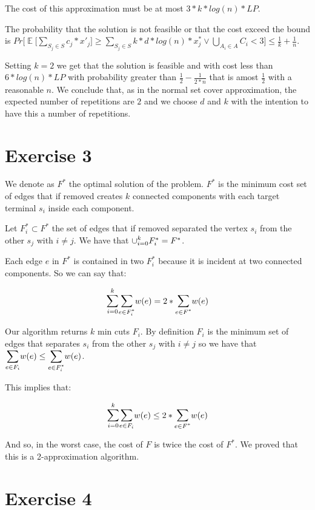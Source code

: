 \documentclass[paper=a4, fontsize=11pt]{scrartcl} %
\numberwithin{equation}{section} %
\numberwithin{figure}{section} %
\numberwithin{table}{section} %
\DeclareMathOperator*{\E}{\mathbb{E}}
\begin{document}
The cost of this approximation must be at most $3*k*log(n)*LP$.

The probability that the solution is not feasible or that the cost exceed the bound is $Pr\Big[\E\big[\sum_{S_j \in S} c_j*x'_j\big] \geq \sum_{S_j \in S} k*d*log(n)*x^*_j \lor \bigcup_{A_i \in A} C_i < 3\Big] \leq \frac{1}{k} + \frac{1}{n}$.

Setting $k = 2$ we get that the solution is feasible and with cost less than $6*log(n)*LP$ with probability greater than $\frac{1}{2} - \frac{1}{2*n}$ that is amost $\frac{1}{2}$ with a reasonable $n$.
We conclude that, as in the normal set cover approximation, the expected number of repetitions are $2$ and we choose $d$ and $k$ with the intention to have this a number of repetitions.

\section{Exercise 3}

We denote as $F^*$ the optimal solution of the problem. $F^*$ is the minimum cost set of edges that if removed creates $k$ connected components with each target terminal $s_i$ inside each component.

Let $F_i^* \subset F^*$ the set of edges that if removed separated the vertex $s_i$ from the other $s_j$ with $i \ne j$. We have that $\mathlarger{\cup}_{i = 0}^k F_i^* = F^*$.

Each edge $e$ in $F^*$ is contained in two $F_i^*$ because it is incident at two connected components. So we can say that:

\[
\mathlarger{\sum}_{i = 0}^k \mathlarger{\sum}_{e \in F_i^*} w(e) = 2*\mathlarger{\sum}_{e \in F^*} w(e)
\]

Our algorithm returns $k$ min cuts $F_i$. By definition $F_i$ is the minimum set of edges that separates $s_i$ from the other $s_j$ with $i \ne j$ so we have that $\mathlarger{\sum}_{e \in F_i} w(e) \leq \mathlarger{\sum}_{e \in F_i^*} w(e)$.

This implies that:

\[
\mathlarger{\sum}_{i = 0}^k \mathlarger{\sum}_{e \in F_i} w(e) \leq 2*\mathlarger{\sum}_{e \in F^*} w(e)
\]

And so, in the worst case, the cost of $F$ is twice the cost of $F^*$. We proved that this is a 2-approximation algorithm.

\section{Exercise 4}
\end{document}
